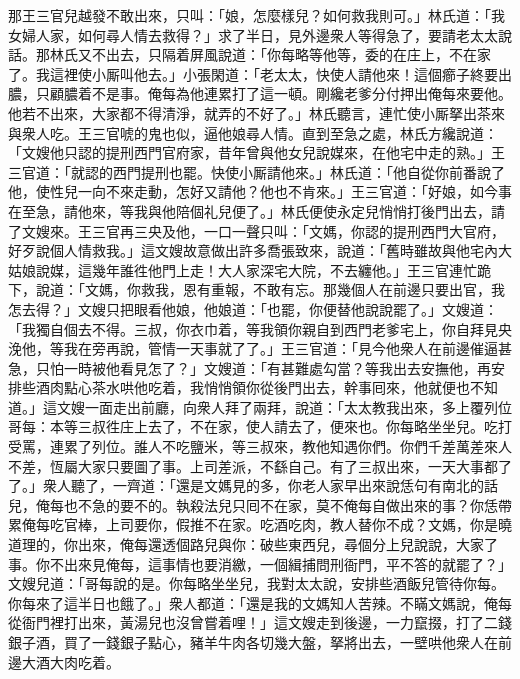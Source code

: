 那王三官兒越發不敢出來，只叫：「娘，怎麼樣兒？如何救我則可。」林氏道：「我女婦人家，如何尋人情去救得？」求了半日，見外邊衆人等得急了，要請老太太說話。那林氏又不出去，只隔着屏風說道：「你每略等他等，委的在庄上，不在家了。我這裡使小厮叫他去。」小張閑道：「老太太，快使人請他來！這個癤子終要出膿，只顧膿着不是事。{}俺每為他連累打了這一頓。剛纔老爹分付押出俺每來要他。他若不出來，大家都不得清淨，就弄的不好了。」林氏聽言，連忙使小厮拏出茶來與衆人吃。王三官唬的鬼也似，逼他娘尋人情。{}直到至急之處，林氏方纔說道：「文嫂他只認的提刑西門官府家，昔年曾與他女兒說媒來，在他宅中走的熟。」王三官道：「就認的西門提刑也罷。快使小厮請他來。」林氏道：「他自從你前番說了他，使性兒一向不來走動，怎好又請他？他也不肯來。」王三官道：「好娘，如今事在至急，請他來，等我與他陪個礼兒便了。」{}林氏便使永定兒悄悄打後門出去，請了文嫂來。王三官再三央及他，一口一聲只叫：{}「文媽，你認的提刑西門大官府，好歹說個人情救我。」這文嫂故意做出許多喬張致來，說道：「舊時雖故與他宅內大姑娘說媒，這幾年誰徃他門上走！大人家深宅大院，不去纏他。」王三官連忙跪下，{}說道：「文媽，你救我，恩有重報，不敢有忘。那幾個人在前邊只要出官，我怎去得？」文嫂只把眼看他娘，他娘道：「也罷，你便替他說說罷了。」文嫂道：「我獨自個去不得。三叔，你衣巾着，等我領你親自到西門老爹宅上，你自拜見央浼他，等我在旁再說，管情一天事就了了。」王三官道：「見今他衆人在前邊催逼甚急，只怕一時被他看見怎了？」文嫂道：「有甚難處勾當？等我出去安撫他，再安排些酒肉點心茶水哄他吃着，我悄悄領你從後門出去，幹事囘來，他就便也不知道。」這文嫂一面走出前廳，向衆人拜了兩拜，說道：「太太教我出來，多上覆列位哥每：本等三叔徃庄上去了，不在家，使人請去了，便來也。你每略坐坐兒。吃打受罵，連累了列位。誰人不吃鹽米，等三叔來，教他知遇你們。你們千差萬差來人不差，恆屬大家只要圖了事。上司差派，不繇自己。有了三叔出來，一天大事都了了。」衆人聽了，一齊道：「還是文媽見的多，你老人家早出來說恁句有南北的話兒，俺每也不急的要不的。執殺法兒只囘不在家，莫不俺每自做出來的事？你恁帶累俺每吃官棒，上司要你，假推不在家。吃酒吃肉，教人替你不成？文媽，你是曉道理的，你出來，俺每還透個路兒與你：破些東西兒，尋個分上兒說說，大家了事。你不出來見俺每，這事情也要消繳，一個緝捕問刑衙門，平不答的就罷了？」文嫂兒道：「哥每說的是。你每略坐坐兒，我對太太說，安排些酒飯兒管待你每。你每來了這半日也餓了。」衆人都道：「還是我的文媽知人苦辣。不瞞文媽說，俺每從衙門裡打出來，黃湯兒也沒曾嘗着哩！」這文嫂走到後邊，一力竄掇，打了二錢銀子酒，買了一錢銀子點心，豬羊牛肉各切幾大盤，拏將出去，一壁哄他衆人在前邊大酒大肉吃着。

